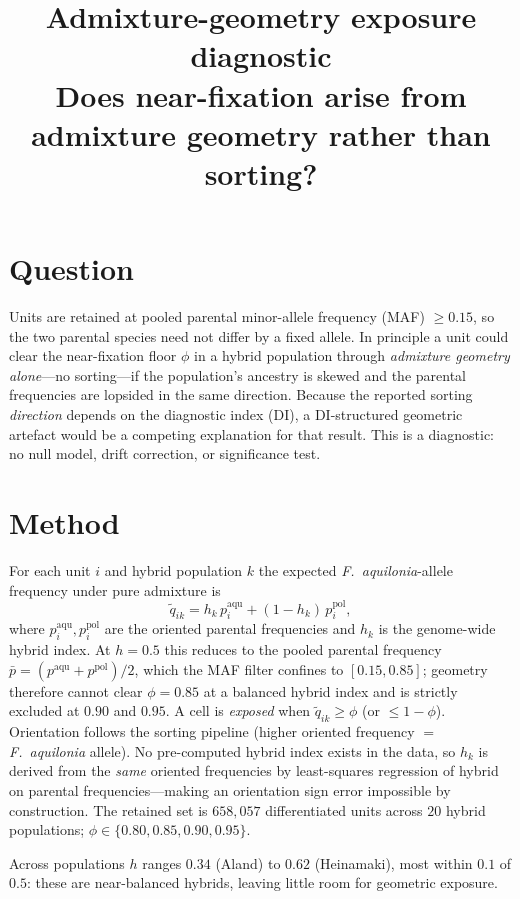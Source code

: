 \documentclass[11pt]{article}
\title{\vspace{-3.5em}\textbf{\color{Accent}Admixture-geometry exposure diagnostic}\\[0.2em]
\large Does near-fixation arise from admixture geometry rather than sorting?}
\author{}
\date{}
\newcommand{\Faq}{\textit{F.~aquilonia}}
\begin{document}
\maketitle
\vspace{-3.5em}

\section*{Question}
Units are retained at pooled parental minor-allele frequency (MAF) $\ge 0.15$, so the two
parental species need not differ by a fixed allele. In principle a unit could clear the
near-fixation floor $\phi$ in a hybrid population through \emph{admixture geometry alone}---no
sorting---if the population's ancestry is skewed and the parental frequencies are lopsided in
the same direction. Because the reported sorting \emph{direction} depends on the diagnostic
index (DI), a DI-structured geometric artefact would be a competing explanation for that
result. This is a diagnostic: no null model, drift correction, or significance test.

\section*{Method}
For each unit $i$ and hybrid population $k$ the expected \Faq-allele frequency under pure
admixture is
\[
\tilde q_{ik}=h_k\,p^{\mathrm{aqu}}_i+(1-h_k)\,p^{\mathrm{pol}}_i,
\]
where $p^{\mathrm{aqu}}_i,p^{\mathrm{pol}}_i$ are the oriented parental frequencies and $h_k$ is
the genome-wide hybrid index. At $h=0.5$ this reduces to the pooled parental frequency
$\bar p=(p^{\mathrm{aqu}}+p^{\mathrm{pol}})/2$, which the MAF filter confines to $[0.15,0.85]$;
geometry therefore cannot clear $\phi=0.85$ at a balanced hybrid index and is strictly excluded
at $0.90$ and $0.95$. A cell is \emph{exposed} when $\tilde q_{ik}\ge\phi$ (or $\le 1-\phi$).
Orientation follows the sorting pipeline (higher oriented frequency $=$ \Faq{} allele). No
pre-computed hybrid index exists in the data, so $h_k$ is derived from the \emph{same} oriented
frequencies by least-squares regression of hybrid on parental frequencies---making an
orientation sign error impossible by construction. The retained set is
$658{,}057$ differentiated units across $20$ hybrid populations; $\phi\in\{0.80,0.85,0.90,0.95\}$.

Across populations $h$ ranges $0.34$ (Aland) to $0.62$ (Heinamaki), most within $0.1$ of $0.5$:
these are near-balanced hybrids, leaving little room for geometric exposure.
\end{document}
